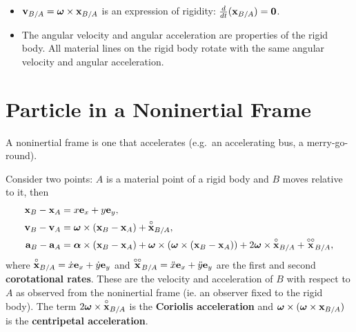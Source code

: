 \documentclass[
  letterpaper,
  DIV=11,
  numbers=noendperiod]{scrreprt}
\providecommand{\tightlist}{%
  \setlength{\itemsep}{0pt}\setlength{\parskip}{0pt}}
\newcommand{\lp}{\left(}
\newcommand{\rp}{\right)}
\newcommand{\bomega}{\boldsymbol{\omega}}
\newcommand{\balpha}{\boldsymbol{\alpha}}
\begin{document}
\begin{tcolorbox}[enhanced jigsaw, arc=.35mm, bottomrule=.15mm, bottomtitle=1mm, breakable, colback=white, colbacktitle=quarto-callout-important-color!10!white, colframe=quarto-callout-important-color-frame, coltitle=black, left=2mm, leftrule=.75mm, opacityback=0, opacitybacktitle=0.6, rightrule=.15mm, title=\textcolor{quarto-callout-important-color}{\faExclamation}\hspace{0.5em}{Note!}, titlerule=0mm, toprule=.15mm, toptitle=1mm]

\begin{itemize}
\tightlist
\item
  \({\bf v}_{B/A} = \bomega\times{\bf x}_{B/A}\) is an expression of
  rigidity: \(\frac{d}{dt}({\bf x}_{B/A})={\bf 0}\).
\item
  The angular velocity and angular acceleration are properties of the
  rigid body. All material lines on the rigid body rotate with the same
  angular velocity and angular acceleration.
\end{itemize}

\end{tcolorbox}

\section{Particle in a Noninertial
Frame}\label{particle-in-a-noninertial-frame}

A noninertial frame is one that accelerates (e.g.~an accelerating bus, a
merry-go-round).

Consider two points: \(A\) is a material point of a rigid body and \(B\)
moves relative to it, then \begin{align}
    {\bf x}_B-{\bf x}_A &= x{\bf e}_x+y{\bf e}_y,\\
    {\bf v}_B-{\bf v}_A &= \bomega\times({\bf x}_B-{\bf x}_A)+\overset{\circ}{\bf x}_{B/A},\\
    {\bf a}_B-{\bf a}_A &= \balpha\times({\bf x}_B-{\bf x}_A)+\bomega\times\lp\bomega\times\lp{\bf x}_B-{\bf x}_A\rp\rp+2\bomega\times\overset{\circ}{\bf x}_{B/A}+\overset{\circ\circ}{\bf x}_{B/A},
\end{align} where
\(\overset{\circ}{\bf x}_{B/A} = \dot{x}{\bf e}_x+\dot{y}{\bf e}_y\) and
\(\overset{\circ\circ}{\bf x}_{B/A} = \ddot{x}{\bf e}_x+\ddot{y}{\bf e}_y\)
are the first and second \textbf{corotational rates}. These are the
velocity and acceleration of \(B\) with respect to \(A\) as observed
from the noninertial frame (ie. an observer fixed to the rigid body).
The term \(2\bomega\times\overset{\circ}{\bf x}_{B/A}\) is the
\textbf{Coriolis acceleration} and
\(\bomega\times(\bomega\times{\bf x}_{B/A})\) is the \textbf{centripetal
acceleration}.
\end{document}
